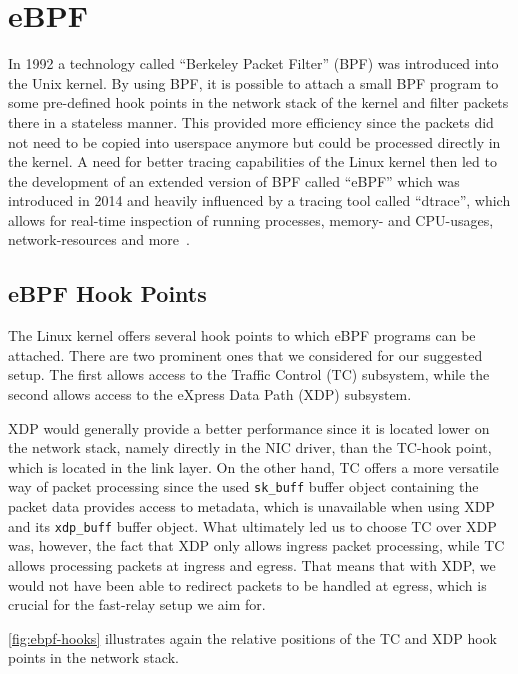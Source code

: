 \section{eBPF}\label{sec:ebpf_bg}
In 1992 a technology called ``Berkeley Packet Filter'' (BPF) was introduced into 
the Unix kernel.
By using BPF, it is possible to attach a small BPF program to some pre-defined hook points in 
the network stack of the kernel and filter packets there in a stateless manner.
This provided more efficiency since the packets did not need to be copied into 
userspace anymore but could be processed directly in the kernel.
A need for better tracing capabilities of the Linux kernel then led to the development 
of an extended version of BPF called ``eBPF'' which was introduced in 2014 and 
heavily influenced by a tracing tool called ``dtrace'', which allows for 
real-time inspection of running processes, memory- and CPU-usages, network-resources 
and more~\parencite{ebpf-intro-tigera}.

\subsection{eBPF Hook Points}
The Linux kernel offers several hook points to which eBPF programs can be attached.
There are two prominent ones that we considered for our suggested setup.
The first allows access to the Traffic Control (TC) subsystem, while the 
second allows access to the eXpress Data Path (XDP) subsystem.

XDP would generally provide a better performance since it is located 
lower on the network stack, namely directly in the NIC driver, than the 
TC-hook point, which is located in the link layer.
On the other hand, TC offers a more versatile way of packet processing since 
the used \verb|sk_buff| buffer object containing the packet data provides access to metadata, which is unavailable when using XDP and its \verb|xdp_buff| buffer object.
What ultimately led us to choose TC over XDP was, however, the fact that 
XDP only allows ingress packet processing, while TC allows processing packets at ingress and egress.
That means that with XDP, we would not have been able to redirect packets to be handled 
at egress, which is crucial for the fast-relay setup we aim for. %

\autoref{fig:ebpf-hooks} illustrates again the relative positions of the TC and
XDP hook points in the network stack.

